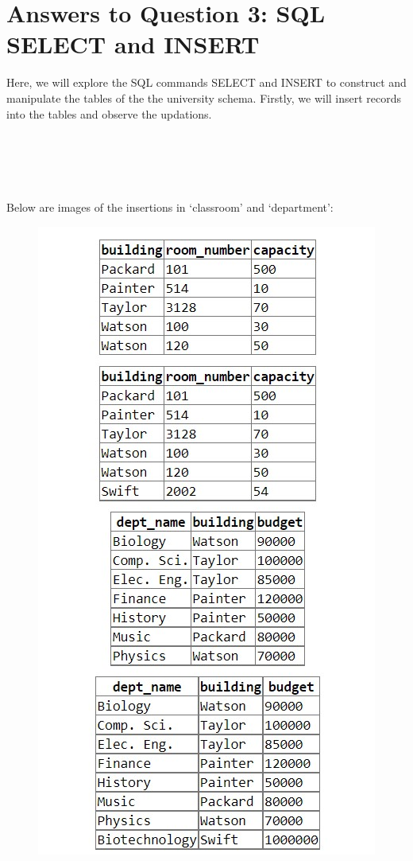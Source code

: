 \documentclass{article}
\begin{document}
\newpage
\section{Answers to Question 3: SQL SELECT and INSERT}
Here, we will explore the SQL commands SELECT and INSERT to construct and manipulate the tables of the the university schema. Firstly, we will insert records into the tables and observe the updations.
\\ \\ \\
{
}
\newpage \noindent
{
}
\\ \\ \\ Below are images of the insertions in `classroom' and `department':
\begin{figure}[hbt]
    \centering
    \includegraphics[scale=1.25]{pics/insert-pic1.jpg}
    \label{fig:ins1}
\end{figure} \newpage \noindent
\end{document}
